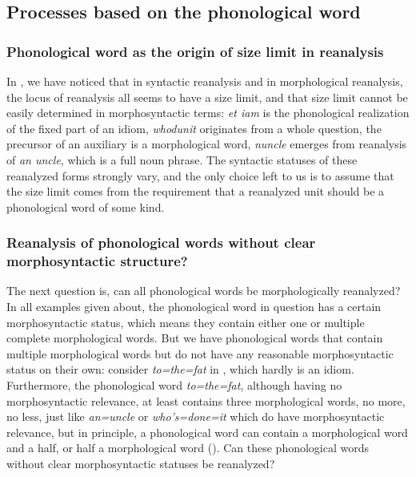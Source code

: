 \documentclass[a4paper, oneside, scheme=plain, 12pt]{article}
\newcommand{\form}[1]{\emph{#1}}
\begin{document}
\subsection{Processes based on the phonological word}\label{sec:phonological-word-evolution}

\subsubsection{Phonological word as the origin of size limit in reanalysis}\label{sec:reanalysis-size-limit-phonological-word}

In , we have noticed that in syntactic reanalysis and in morphological reanalysis,
the locus of reanalysis all seems to have a size limit,
and that size limit cannot be easily determined in morphosyntactic terms:
\form{et iam} is the phonological realization of the fixed part of an idiom,
\form{whodunit} originates from a whole question,
the precursor of an auxiliary is a morphological word,
\form{nuncle} emerges from reanalysis of \form{an uncle}, which is a full noun phrase.
The syntactic statuses of these reanalyzed forms strongly vary,
and the only choice left to us is to assume that the size limit comes from the requirement that a reanalyzed unit should be a phonological word of some kind.

\subsubsection{Reanalysis of phonological words without clear morphosyntactic structure?}\label{sec:reanalysis-without-grammar}

The next question is, can all phonological words be morphologically reanalyzed?
In all examples given about, the phonological word in question has a certain morphosyntactic status,
which means they contain either one or multiple complete morphological words.
But we have phonological words that contain multiple morphological words but do not have any reasonable morphosyntactic status on their own:
consider \form{to=the=fat} in , which hardly is an idiom.
Furthermore, the phonological word \form{to=the=fat},
although having no morphosyntactic relevance, at least contains three morphological words, no more, no less,
just like \form{an=uncle} or \form{who's=done=it} which do have morphosyntactic relevance,
but in principle, a phonological word can contain a morphological word and a half, or half a morphological word
().
Can these phonological words without clear morphosyntactic statuses be reanalyzed?
\end{document}
